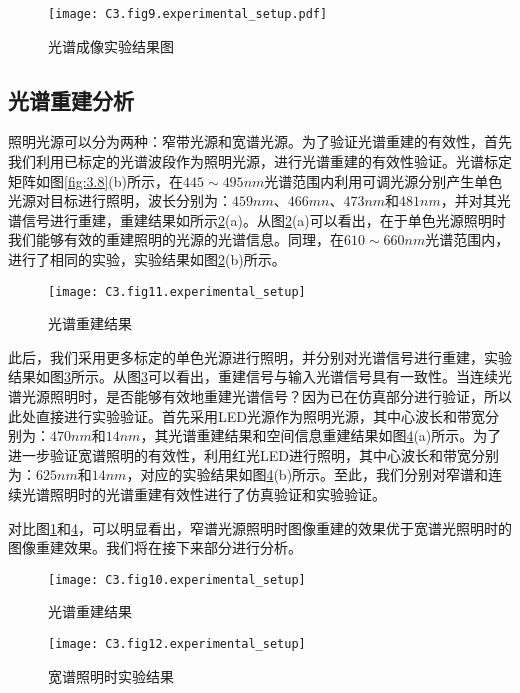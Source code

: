 \begin{figure}[htp]
	\centering
	\texttt{[image: C3.fig9.experimental\_setup.pdf]}
	\caption{光谱成像实验结果图}
	\label{fig:3.9}
\end{figure}

\subsection{光谱重建分析}
照明光源可以分为两种：窄带光源和宽谱光源。为了验证光谱重建的有效性，首先我们利用已标定的光谱波段作为照明光源，进行光谱重建的有效性验证。光谱标定矩阵如图\ref{fig:3.8}(b)所示，在$445 \sim 495nm$光谱范围内利用可调光源分别产生单色光源对目标进行照明，波长分别为：$459nm$、$466mn$、$473nm$和$481nm$，并对其光谱信号进行重建，重建结果如所示\ref{fig:3.10}(a)。从图\ref{fig:3.10}(a)可以看出，在于单色光源照明时我们能够有效的重建照明的光源的光谱信息。同理，在$610 \sim 660nm$光谱范围内，进行了相同的实验，实验结果如图\ref{fig:3.10}(b)所示。

\begin{figure}[htp]
	\centering
	\texttt{[image: C3.fig11.experimental\_setup]}
	\caption{光谱重建结果}
	\label{fig:3.10}
\end{figure}

此后，我们采用更多标定的单色光源进行照明，并分别对光谱信号进行重建，实验结果如图\ref{fig:3.11}所示。从图\ref{fig:3.11}可以看出，重建信号与输入光谱信号具有一致性。当连续光谱光源照明时，是否能够有效地重建光谱信号？因为已在仿真部分进行验证，所以此处直接进行实验验证。首先采用LED光源作为照明光源，其中心波长和带宽分别为：$470nm$和$14nm$，其光谱重建结果和空间信息重建结果如图\ref{fig:3.12}(a)所示。为了进一步验证宽谱照明的有效性，利用红光LED进行照明，其中心波长和带宽分别为：$625nm$和$14nm$，对应的实验结果如图\ref{fig:3.12}(b)所示。至此，我们分别对窄谱和连续光谱照明时的光谱重建有效性进行了仿真验证和实验验证。

对比图\ref{fig:3.9}和\ref{fig:3.12}，可以明显看出，窄谱光源照明时图像重建的效果优于宽谱光照明时的图像重建效果。我们将在接下来部分进行分析。

\begin{figure}[htp]
	\centering
	\texttt{[image: C3.fig10.experimental\_setup]}
	\caption{光谱重建结果}
	\label{fig:3.11}
\end{figure}
\begin{figure}[htp]
	\centering
	\texttt{[image: C3.fig12.experimental\_setup]}
	\caption{宽谱照明时实验结果}
	\label{fig:3.12}
\end{figure}

